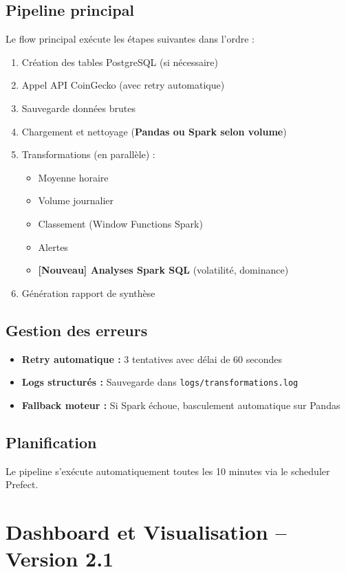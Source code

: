 \documentclass[12pt,a4paper]{article}
\begin{document}
\subsection{Pipeline principal}
Le flow principal exécute les étapes suivantes dans l'ordre :
\begin{enumerate}[noitemsep]
    \item Création des tables PostgreSQL (si nécessaire)
    \item Appel API CoinGecko (avec retry automatique)
    \item Sauvegarde données brutes
    \item Chargement et nettoyage (\textbf{Pandas ou Spark selon volume})
    \item Transformations (en parallèle) :
    \begin{itemize}[noitemsep]
        \item Moyenne horaire
        \item Volume journalier
        \item Classement (Window Functions Spark)
        \item Alertes
        \item \textbf{[Nouveau] Analyses Spark SQL} (volatilité, dominance)
    \end{itemize}
    \item Génération rapport de synthèse
\end{enumerate}

\subsection{Gestion des erreurs}
\begin{itemize}
    \item \textbf{Retry automatique :} 3 tentatives avec délai de 60 secondes
    \item \textbf{Logs structurés :} Sauvegarde dans \texttt{logs/transformations.log}
    \item \textbf{Fallback moteur :} Si Spark échoue, basculement automatique sur Pandas
\end{itemize}

\subsection{Planification}
Le pipeline s'exécute automatiquement toutes les 10 minutes via le scheduler Prefect.

\section{Dashboard et Visualisation -- Version 2.1}
\end{document}
